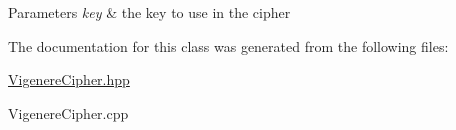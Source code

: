 \begin{DoxyParams}{Parameters}
{\em key} & the key to use in the cipher \\
\hline
\end{DoxyParams}


The documentation for this class was generated from the following files\+:\begin{DoxyCompactItemize}
\item 
\hyperlink{_vigenere_cipher_8hpp}{Vigenere\+Cipher.\+hpp}\item 
Vigenere\+Cipher.\+cpp\end{DoxyCompactItemize}
